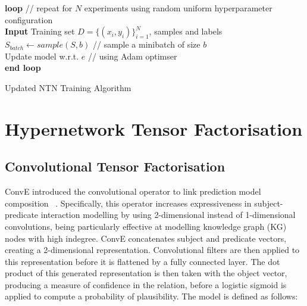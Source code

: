 \begin{algorithm}[H]
	\textbf{loop} // repeat for $N$ experiments using random uniform hyperparameter configuration \\
		\SetAlgoLined
		\textbf{Input} 
		Training set \begin{math} D = \{(x_i, y_i)\}_{i=1}^N \end{math}, samples and labels\;
  		\begin{math} S_{batch} \gets sample(S, b) \end{math} // sample a minibatch of size \begin{math} b \end{math} \\
		Update model w.r.t. \begin{math}  e \end{math} // using Adam optimser \\
	\textbf{end loop}
	\caption{Updated NTN Training Algorithm}
\end{algorithm} \newpage



\section{Hypernetwork Tensor Factorisation}

\subsection{Convolutional Tensor Factorisation}
ConvE introduced the convolutional operator to link prediction model composition ~\citep{dettmers2018convolutional}. Specifically, this operator increases expressiveness in subject-predicate interaction modelling by using 2-dimensional instead of 1-dimensional convolutions, being particularly effective at modelling knowledge graph (KG) nodes with high indegree. ConvE concatenates subject and predicate vectors, creating a 2-dimensional representation. Convolutional filters are then applied to this representation before it is flattened by a fully connected layer. The dot product of this generated representation is then taken with the object vector, producing a measure of confidence in the relation, before a logistic sigmoid is applied to compute a probability of plausibility. The model is defined as follows:

